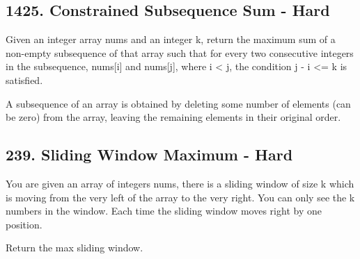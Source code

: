 \documentclass[9pt, b5paaper]{book}
\begin{document}
\subsection{1425. Constrained Subsequence Sum - Hard}
\label{sec-5-0-10}
Given an integer array nums and an integer k, return the maximum sum of a non-empty subsequence of that array such that for every two consecutive integers in the subsequence, nums[i] and nums[j], where i < j, the condition j - i <= k is satisfied.

A subsequence of an array is obtained by deleting some number of elements (can be zero) from the array, leaving the remaining elements in their original order.

\subsection{239. Sliding Window Maximum - Hard}
\label{sec-5-0-11}
You are given an array of integers nums, there is a sliding window of size k which is moving from the very left of the array to the very right. You can only see the k numbers in the window. Each time the sliding window moves right by one position.

Return the max sliding window.
\end{document}
